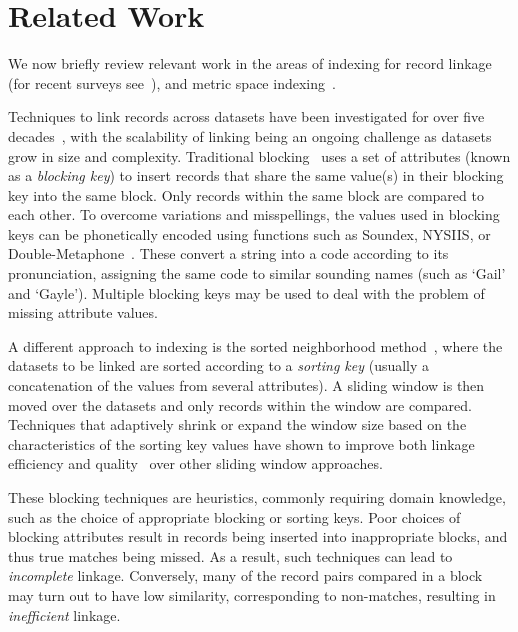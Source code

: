 \documentclass{llncs}
\begin{document}

\section{Related Work}
\label{sec-related}

We now briefly review relevant work in the areas of indexing
for record linkage (for recent surveys see~\cite{Chr12b,Pap16}),
and metric space indexing~\cite{Zezula2010}.

Techniques to link records across datasets have been investigated for
over five decades~\cite{Fel69,New59}, with the scalability of linking
being an ongoing challenge as datasets grow in size and
complexity. Traditional blocking~\cite{Chr12b} uses a set of attributes
(known as a \emph{blocking key}) to insert records that share the same
value(s) in their blocking key into the same block. Only records within
the same block are  compared to each other. To overcome variations and
misspellings, the values used in blocking keys can be phonetically
encoded using functions such as Soundex, NYSIIS, or
Double-Metaphone~\cite{Chr12}. These convert a string into a
code according to its pronunciation, assigning the same code to similar
sounding names (such as `Gail' and `Gayle'). Multiple blocking keys may
be used to deal with the problem of missing attribute values.

A different approach to indexing is the sorted neighborhood
method~\cite{Mon96}, where the datasets to be linked are sorted
according to a \emph{sorting key} (usually a concatenation of the values
from several attributes). A sliding window is then moved over the
datasets and only records within the window are compared. Techniques
that adaptively shrink or expand the window size based on the
characteristics of the sorting key values have shown to improve both
linkage efficiency and quality~\cite{Dra12} over other sliding window
approaches.

These blocking techniques are heuristics, commonly requiring domain
knowledge, such as the choice of appropriate blocking or sorting keys.
Poor choices of blocking attributes result in records being inserted
into inappropriate blocks, and thus true matches being missed. As a
result, such techniques can lead to \emph{incomplete} linkage.
Conversely, many of the record pairs compared in a block may turn
out to have low similarity, corresponding to non-matches, resulting in
\emph{inefficient} linkage.
\end{document}
